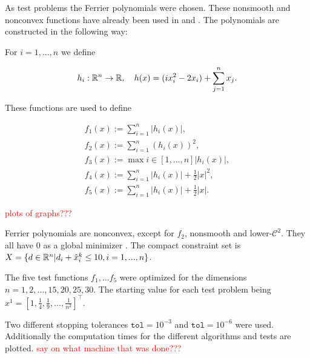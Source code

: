 As test problems the Ferrier polynomials were chosen. These nonsmooth and nonconvex functions have already been used in \cite{Hare2010} and \cite{Hare2016}. The polynomials are constructed in the following way:

For \(i = 1,...,n\) we define 

\begin{align*}
	h_i: \mathbb{R}^n \to \mathbb{R}, \quad h(x) = (ix_i^2-2x_i)+\sum_{j=1}^n x_j.
\end{align*}

These functions are used to define

\begin{align*}
	f_1(x) := \sum_{i=1}^n |h_i(x)|, \\
	f_2(x) := \sum_{i=1}^n (h_i(x))^2, \\
	f_3(x) := \max{i \in [1,...,n]}|h_i(x)|, \\
	f_4(x) := \sum_{i=1}^n |h_i(x)|+\frac{1}{2}|x|^2, \\
	f_5(x) := \sum_{i=1}^n |h_i(x)|+\frac{1}{2}|x|.
\end{align*}

\textcolor{red}{plots of graphs???}

Ferrier polynomials are nonconvex, except for \(f_2\), nonsmooth and lower-\(\mathcal{C}^2\). They all have \(0\) as a global minimizer \cite{Hare2010}. The compact constraint set is \(X=\{d \in \mathbb{R}^n|d_i+\hat{x}^k_i \leq 10, i = 1,...,n \}\).

The five test functions \(f_1,...f_5\) were optimized for the dimensions \(n=1,2,...,15,20,25,30\).
The starting value for each test problem being \(x^1=[1,\frac{1}{4},\frac{1}{9},...,\frac{1}{n^2}]^{\top}\).




Two different stopping tolerances \(\mathtt{tol}=10^{-3}\) and \(\mathtt{tol}=10^{-6}\) were used.
Additionally the computation times for the different algorithms and tests are plotted. \textcolor{red}{say on what machine that was done???}



